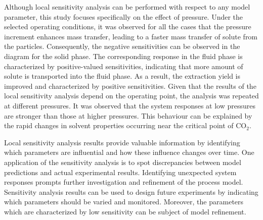\documentclass[a4paper,fleqn]{cas-dc}
\begin{document}

{\color{blue}Although local sensitivity analysis can be performed with respect to any model parameter, this study focuses specifically on the effect of pressure. Under the selected operating conditions, it was observed for all the cases that the pressure increment enhances mass transfer, leading to a faster mass transfer of solute from the particles. Consequently, the negative sensitivities can be observed in the diagram for the solid phase. The corresponding response in the fluid phase is characterized by positive-valued sensitivities, indicating that more amount of solute is transported into the fluid phase. As a result, the extraction yield is improved and characterized by positive sensitivities. Given that the results of the local sensitivity analysis depend on the operating point, the analysis was repeated at different pressures. It was observed that the system responses at low pressures are stronger than those at higher pressures. This behaviour can be explained by the rapid changes in solvent properties occurring near the critical point of CO$_2$}.

Local sensitivity analysis results provide valuable information by identifying which parameters are influential and how these influence changes over time. One application of the sensitivity analysis is to spot discrepancies between model predictions and actual experimental results. Identifying unexpected system responses prompts further investigation and refinement of the process model. Sensitivity analysis results can be used to design future experiments by indicating which parameters should be varied and monitored. Moreover, the parameters which are characterized by low sensitivity can be subject of model refinement. 
\end{document}
